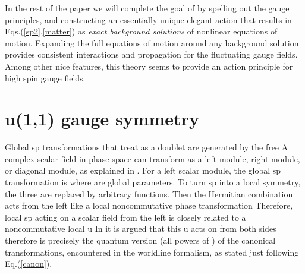 \documentclass[a4paper,12pt]{article}
\begin{document}
In the rest of the paper we will complete the goal of \cite{NCSp} by
spelling out the gauge principles, and constructing an essentially unique
elegant action that results in Eqs.(\ref{sp2},\ref{matter}) as \textit{exact
background solutions} of nonlinear equations of motion. Expanding the full
equations of motion around any background solution provides consistent
interactions and propagation for the fluctuating gauge fields. Among other
nice features, this theory seems to provide an action principle for high
spin gauge fields.

\section{u\myHighlight{$_{\star }$}\coordHE{}(1,1) gauge symmetry}

Global sp\coordHE{} transformations that treat \coordHE{} as a doublet are generated by the free \coordHE{} A complex scalar field in phase space \coordHE{} can transform as a left module, right module, or
diagonal module, as explained in \cite{NCSp}. For a left scalar module, the
global sp\coordHE{} transformation is \coordHE{} where \coordHE{} are
global parameters. To turn sp\coordHE{} into a local symmetry, the
three \coordHE{} are replaced by arbitrary functions. Then the Hermitian
combination \coordHE{} acts from the left like a local
noncommutative phase transformation \coordHE{} Therefore, local sp\coordHE{} acting on a scalar field
from the left is closely related to a noncommutative local u\coordHE{} In \cite{NCSp} it is argued that this u\myHighlight{$_{\star }\left( 1\right) 
$}\coordHE{} acts on \coordHE{} from both sides \coordHE{} therefore \coordHE{} is precisely the quantum version (all powers
of \myHighlight{$\hbar $}\coordHE{}) of the canonical transformations, encountered in the worldline
formalism, as stated just following Eq.(\ref{canon}).
\end{document}
